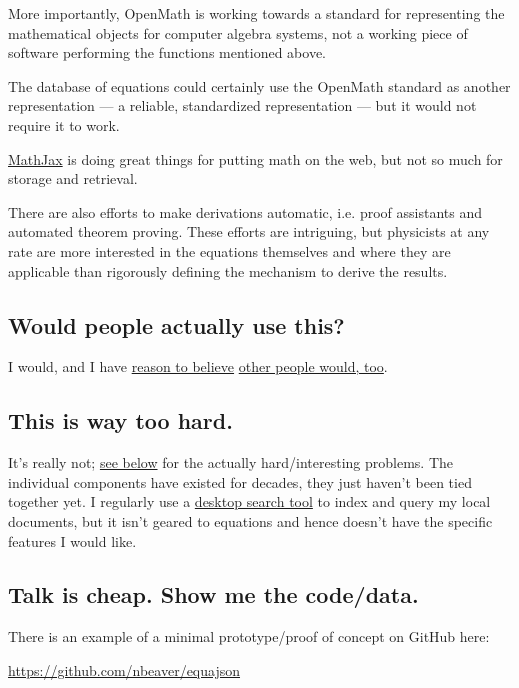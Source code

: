 \documentclass[12pt,letterpaper]{article}
\begin{document}
More importantly,
OpenMath is working towards a standard for representing the mathematical objects for computer algebra systems,
not a working piece of software performing the functions mentioned above.

The database of equations could certainly use the OpenMath standard as another representation
--- a reliable, standardized representation ---
but it would not require it to work.

\href{http://www.mathjax.org/}
{MathJax} is doing great things for putting math on the web,
but not so much for storage and retrieval.

There are also efforts to make derivations automatic,
i.e. proof assistants and automated theorem proving.
These efforts are intriguing,
but physicists at any rate are more interested in the equations themselves and where they are applicable
than rigorously defining the mechanism to derive the results.

\subsection{Would people actually use this?}

I would, and I have
\href{http://www.researchgate.net/post/I_am_looking_for_an_equation_database_or_digital_list_of_equations}
{reason to believe}
\href{http://productforums.google.com/forum/#!topic/websearch/lVJiyCSl-xk}
{other people would, too}.

\subsection{This is way too hard.}

It's really not;
\hyperref[sec:ambitious]
{see below} for the actually hard/interesting problems.
The individual components have existed for decades,
they just haven't been tied together yet.
I regularly use a
\href{https://en.wikipedia.org/wiki/Recoll}
{desktop search tool} to index and query my local documents,
but it isn't geared to equations and hence doesn't have the specific features I would like.

\subsection{Talk is cheap. Show me the code/data.}

There is an example of a minimal prototype/proof of concept on GitHub here:

\url{https://github.com/nbeaver/equajson}
\end{document}

